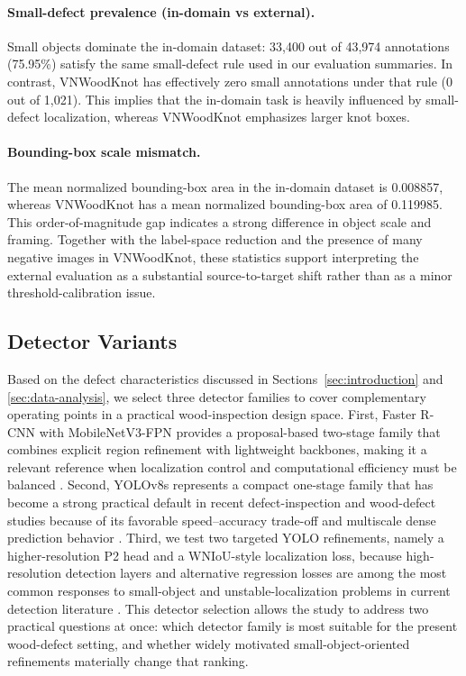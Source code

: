 \paragraph{Small-defect prevalence (in-domain vs external).}
Small objects dominate the in-domain dataset: 33,400 out of 43,974 annotations (75.95\%) satisfy the same small-defect rule used in our evaluation summaries. In contrast, VNWoodKnot has effectively zero small annotations under that rule (0 out of 1,021). This implies that the in-domain task is heavily influenced by small-defect localization, whereas VNWoodKnot emphasizes larger knot boxes.

\paragraph{Bounding-box scale mismatch.}
The mean normalized bounding-box area in the in-domain dataset is 0.008857, whereas VNWoodKnot has a mean normalized bounding-box area of 0.119985. This order-of-magnitude gap indicates a strong difference in object scale and framing. Together with the label-space reduction and the presence of many negative images in VNWoodKnot, these statistics support interpreting the external evaluation as a substantial source-to-target shift rather than as a minor threshold-calibration issue.

\subsection{Detector Variants}
\label{sec:detectors}

Based on the defect characteristics discussed in Sections~\ref{sec:introduction} and \ref{sec:data-analysis}, we select three detector families to cover complementary operating points in a practical wood-inspection design space. First, Faster R-CNN with MobileNetV3-FPN provides a proposal-based two-stage family that combines explicit region refinement with lightweight backbones, making it a relevant reference when localization control and computational efficiency must be balanced \citep{faster_rcnn,mobilenetv3,mittal_2024}. Second, YOLOv8s represents a compact one-stage family that has become a strong practical default in recent defect-inspection and wood-defect studies because of its favorable speed--accuracy trade-off and multiscale dense prediction behavior \citep{ultralytics_yolo,odca_yolo,bpn_yolo,sim_yolo,fdd_yolo}. Third, we test two targeted YOLO refinements, namely a higher-resolution P2 head and a WNIoU-style localization loss, because high-resolution detection layers and alternative regression losses are among the most common responses to small-object and unstable-localization problems in current detection literature \citep{wei_2024_smallreview,hua_2025_smallsurvey,cmc_insulator_small,cmc_msese}. This detector selection allows the study to address two practical questions at once: which detector family is most suitable for the present wood-defect setting, and whether widely motivated small-object-oriented refinements materially change that ranking.

